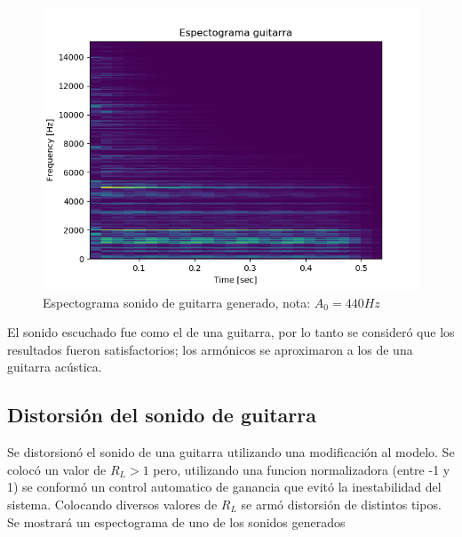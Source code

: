 \documentclass[assd_tp2_main.tex]{subfiles}
\begin{document}
\begin{figure}[H]
	\begin{center}
	\includegraphics[scale=0.5]{graficos/espectograma_guitarra.png}
	\caption{Espectograma sonido de guitarra generado, nota: $A_0=440 Hz$}

	\end{center}
\end{figure}
El sonido escuchado fue como el de una guitarra, por lo tanto se consider\'o que los resultados fueron satisfactorios; los armónicos se aproximaron a los de una guitarra acústica.


\subsection{Distorsión del sonido de guitarra}
Se distorsionó el sonido de una guitarra utilizando una modificación al modelo. Se colocó un valor de $R_L>1$ pero, utilizando una funcion normalizadora (entre -1 y 1) se conformó un control automatico de ganancia que evitó la inestabilidad del sistema. Colocando diversos valores de $R_L$ se armó distorsión de distintos tipos. 
Se mostrará un espectograma de uno de los sonidos generados
\end{document}
